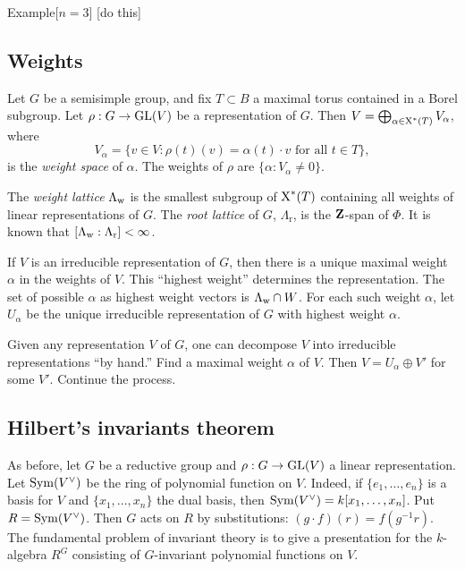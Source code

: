 \begin{enonce}[remark]{Example}[$n=3$]
[do this]
\end{enonce}





\subsection{Weights}

Let $G$ be a semisimple group, and fix $T\subset B$ a maximal torus contained 
in a Borel subgroup. Let $\rho:G\to \operatorname{GL}(V)$ be a representation of 
$G$. Then $V=\bigoplus_{\alpha\in \operatorname{X}^\ast(T)} V_\alpha$, where 
\[
  V_\alpha = \{v\in V:\rho(t)(v) = \alpha(t)\cdot v\text{ for all }t\in T\} ,
\]
is the \emph{weight space} of $\alpha$. The weights of $\rho$ are 
$\{\alpha:V_\alpha\ne 0\}$. 

The \emph{weight lattice} $\Lambda_{\mathrm{w}}$ is the smallest subgroup of 
$\operatorname{X}^\ast(T)$ containing all weights of linear representations of $G$. 
The \emph{root lattice} of $G$, $\Lambda_\mathrm{r}$, is the $\mathbf{Z}$-span of 
$\Phi$. It is known that $[\Lambda_{\mathrm{w}}:\Lambda_\mathrm{r}]<\infty$. 

If $V$ is an irreducible representation of $G$, then there is a unique maximal 
weight $\alpha$ in the weights of $V$. This ``highest weight'' determines the 
representation. The set of possible $\alpha$ as highest weight vectors is 
$\Lambda_{\mathrm{w}}\cap W$. For each such weight $\alpha$, let $U_\alpha$ be the 
unique irreducible representation of $G$ with highest weight $\alpha$. 

Given any representation $V$ of $G$, one can decompose $V$ into irreducible 
representations ``by hand.'' Find a maximal weight $\alpha$ of $V$. Then 
$V=U_\alpha\oplus V'$ for some $V'$. Continue the process. 





\subsection{Hilbert's invariants theorem}

As before, let $G$ be a reductive group and $\rho:G\to \operatorname{GL}(V)$ a 
linear representation. Let $\operatorname{Sym}(V^\vee)$ be the ring of polynomial 
function on $V$. Indeed, if $\{e_1,\dots,e_n\}$ is a basis for $V$ and 
$\{x_1,\dots,x_n\}$ the dual basis, then 
$\operatorname{Sym}(V^\vee) = k[x_1,\dots,x_n]$. Put $R=\operatorname{Sym}(V^\vee)$. Then $G$ 
acts on $R$ by substitutions: $(g\cdot f)(r) = f(g^{-1} r)$. The fundamental 
problem of invariant theory is to give a presentation for the 
$k$-algebra $R^G$ consisting of $G$-invariant polynomial functions on $V$. 

